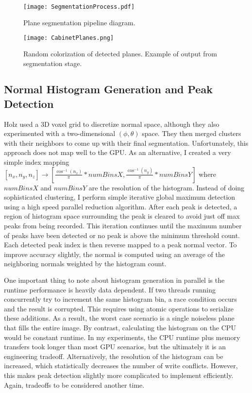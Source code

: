 \begin{figure}[!hp]
    \centering
    \texttt{[image: SegmentationProcess.pdf]}
    \caption{Plane segmentation pipeline diagram.}
    \label{fig:segmentationdiagram}
\end{figure}

\begin{figure}[!htbp]
    \centering
    \texttt{[image: CabinetPlanes.png]}
    \caption{Random colorization of detected planes. Example of output from segmentation stage.}
    \label{fig:segmentationoutput}
\end{figure}

\subsection{Normal Histogram Generation and Peak Detection}
Holz\cite{holz2012real} used a 3D voxel grid to discretize normal space, although they also experimented with a two-dimensional $(\phi,\theta)$ space. They then merged clusters with their neighbors to come up with their final segmentation. Unfortunately, this approach does not map well to the GPU. As an alternative, I created a very simple index mapping $[n_x,n_y,n_z] \to [\frac{\cos^{-1}(n_x)}{\pi}*numBinsX,\frac{\cos^{-1}(n_y)}{\pi}*numBinsY]$ where $numBinsX$ and $numBinsY$ are the resolution of the histogram. Instead of doing sophisticated clustering, I perform simple iterative global maximum detection using a high speed parallel reduction algorithm. After each peak is detected, a region of histogram space surrounding the peak is cleared to avoid just off max peaks from being recorded. This iteration continues until the maximum number of peaks have been detected or no peak is above the minimum threshold count. Each detected peak index is then reverse mapped to a peak normal vector. To improve accuracy slightly, the normal is computed using an average of the neighboring normals weighted by the histogram count.\par
One important thing to note about histogram generation in parallel is the runtime performance is heavily data dependent. If two threads running concurrently try to increment the same histogram bin, a race condition occurs and the result is corrupted. This requires using atomic operations to serialize these additions. As a result, the worst case scenario is a single noiseless plane that fills the entire image. By contrast, calculating the histogram on the CPU would be constant runtime. In my experiments, the CPU runtime plus memory transfers took longer than most GPU scenarios, but the ultimately it is an engineering tradeoff. Alternatively, the resolution of the histogram can be increased, which statistically decreases the number of write conflicts. However, this makes peak detection slightly more complicated to implement efficiently. Again, tradeoffs to be considered another time.
